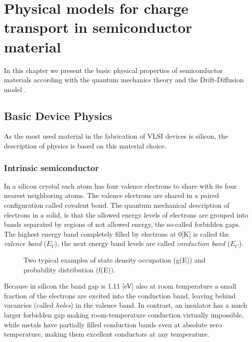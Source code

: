 \chapter{Physical models for charge transport in semiconductor material}

In this chapter we present the basic physical properties of semiconductor materials according with the quantum mechanics theory \citep{ModernVLSIdevices} and the Drift-Diffusion model \cite{Jackson:ElettroClassica}.

\section{Basic Device Physics}

As the most used material in the fabrication of VLSI devices is silicon, the description of physics is based on this material choice.

\subsection{Intrinsic semiconductor}
In a silicon crystal each atom has four valence electrons to share with its four nearest neighboring atoms. The valence electrons are shared in a paired configuration called covalent bond.  The quantum mechanical description of electrons in a solid, is that the allowed energy levels of electrons are grouped into bands separated by regions of not allowed energy, the so-called forbidden gaps. The highest energy band completely filled by electrons at 0[K] is called the \textit{valence band} ($E_V$), the next energy band levels are called \textit{conduction band} ($E_C$).

\begin{figure}[!h]
\centering
{}
\caption{Two typical examples of state density occupation (g(E)) and probability distribution (f(E)).  }
\label{fig: density occupation and prob}
\end{figure}

Because in silicon the band gap is 1.11 [eV] \cite{SolidState} also at room temperature a small fraction of the electrons are excited into the conduction band, leaving behind vacancies (called \textit{holes}) in the valence band.
In contrast, an insulator has a much larger forbidden gap making room-temperature conduction virtually impossible, while metals have partially filled conduction bands even at absolute zero temperature, making them excellent conductors at any temperature. 

